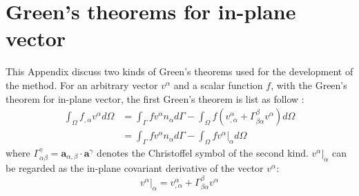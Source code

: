 \section{Green's theorems for in-plane vector}\label{appderivative}
This Appendix discuss two kinds of Green's theorems used for the development of the method. For an arbitrary vector $v^\alpha$ and a scalar function $f$, with the Green's theorem for in-plane vector, the first Green's theorem is list as follow \cite{benzaken2021}:
\begin{equation}
\begin{split}
\int_\Omega f_{,\alpha} v^\alpha d\Omega &= \int_\Gamma f v^\alpha n_\alpha d\Gamma - \int_\Omega f (v_{,\alpha}^\alpha + \Gamma^\beta_{\beta\alpha}v^\alpha) d\Omega \\
&= \int_\Gamma f v^\alpha n_\alpha d\Gamma - \int_\Omega f v^\alpha\vert_\alpha d\Omega
\end{split}
\end{equation}
where $\Gamma^\gamma_{\alpha\beta} = \boldsymbol a_{\alpha,\beta}\cdot \boldsymbol a^\gamma$ denotes the Christoffel symbol of the second kind. $v^\alpha\vert_\alpha$ can be regarded as the in-plane covariant derivative of the vector $v^\alpha$:
\begin{equation}
v^\alpha\vert_\alpha= v^\alpha_{,\alpha} + \Gamma^\beta_{\beta\alpha} v^\alpha
\end{equation}

